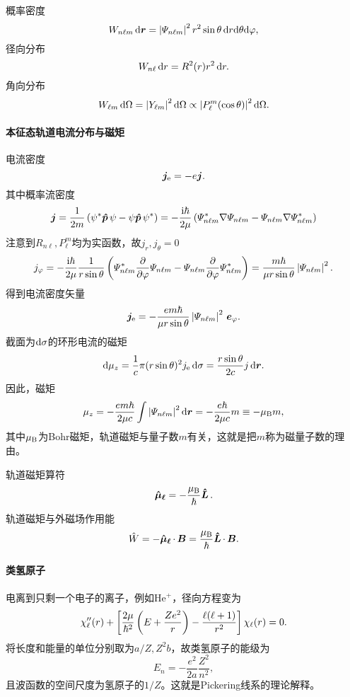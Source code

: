 概率密度
\[
	W_{n\ell m}\mathop{}\!\mathrm{d}\bm r=\left\lvert\varPsi_{n\ell m}\right\rvert^2r^2\sin\theta\mathop{}\!\mathrm{d} r\mathrm{d}\theta\mathrm{d}\varphi,
\]
径向分布
\[
	W_{n\ell}\mathop{}\!\mathrm{d} r=R^2(r)r^2\mathop{}\!\mathrm{d} r.
\]
角向分布
\[
	W_{\ell m}\mathop{}\!\mathrm{d}\Omega=\left\lvert Y_{\ell m}\right\rvert^2\mathop{}\!\mathrm{d}\Omega\propto\left\lvert P_\ell^m(\cos\theta)\right\rvert^2\mathop{}\!\mathrm{d}\Omega.
\]
\paragraph*{本征态轨道电流分布与磁矩}
电流密度
\[
	\bm j_\mathrm e=-e\bm j.
\]
其中概率流密度
\[
	\bm j=\frac1{2m}\left(\psi^\ast\bm{\hat p}\!\mathop{}\psi-\psi\bm{\hat p}\!\mathop{}\psi^\ast\right)=-\frac{\mathrm{i}\hbar}{2\mu}\left(\varPsi_{n\ell m}^\ast\nabla\varPsi_{n\ell m}-\varPsi_{n\ell m}\nabla\varPsi_{n\ell m}^\ast\right)
\]
注意到$R_{n\ell},P_\ell^m$均为实函数，故$j_r,j_\theta=0$
\[
	j_\vf=-\frac{\i\hbar}{2\mu}\frac1{r\sin\ct}\kh{\varPsi_{n\ell m}\cj\pp\vf\varPsi_{n\ell m}-\varPsi_{n\ell m}\pp\vf\varPsi_{n\ell m}\cj}=\frac{m\hbar}{\mu r\sin\theta}\abs{\varPsi_{n\ell m}}^2.
\]
得到电流密度矢量
\begin{align}
	\bm j_\mathrm e=-\frac{em\hbar}{\mu r\sin\theta}\left\lvert\varPsi_{n\ell m}\right\rvert^2\,\bm e_\varphi.
\end{align}
截面为$\mathop{}\!\mathrm{d}\sigma$的环形电流的磁矩
\[
	\mathop{}\!\mathrm{d}\mu_z=\frac1c\pi(r\sin\theta)^2j_\mathrm e\mathop{}\!\mathrm{d}\sigma=\frac{r\sin\theta}{2c}j\mathop{}\!\mathrm{d}\bm r.
\]
因此，磁矩
\begin{align}
	\mu_z=-\frac{em\hbar}{2\mu c}\int\left\lvert\varPsi_{n\ell m}\right\rvert^2\mathop{}\!\mathrm{d}\bm r=-\frac{e\hbar}{2\mu c}m\equiv-\mu_\mathrm B m,
\end{align}
其中$\mu_\mathrm B$为Bohr磁矩，轨道磁矩与量子数$m$有关，这就是把$m$称为磁量子数的理由。

轨道磁矩算符
\[
	\bm{\hat \mu_\ell}\!\mathop{}=-\frac{\mu_\mathrm B}\hbar\bm{\hat L}\!\mathop{}.
\]
轨道磁矩与外磁场作用能
\[
	\hat W=-\bm{\hat \mu_\ell}\!\mathop{}\cdot\,\bm B=\frac{\mu_\mathrm B}\hbar\bm{\hat L}\!\mathop{}\cdot\,\bm B.
\]
\paragraph*{类氢原子}电离到只剩一个电子的离子，例如He$^+$，径向方程变为
\[
	\chi''_\ell(r)+\left[\frac{2\mu}{\hbar^2}\left(E+\frac{Ze^2}{r}\right)-\frac{\ell(\ell+1)}{r^2}\right]\chi_\ell(r)=0.
\]
将长度和能量的单位分别取为$a/Z,Z^2b$，故类氢原子的能级为
\[
	E_n=-\frac{e^2}{2a}\frac{Z^2}{n^2},
\]
且波函数的空间尺度为氢原子的$1/Z$。这就是Pickering线系的理论解释。
